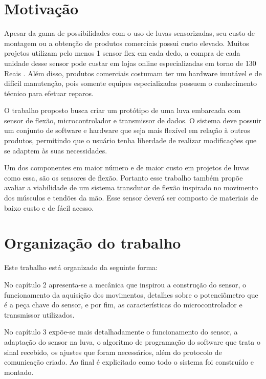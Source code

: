 \documentclass[
	12pt,				%
	openright,			%
	oneside,			%
	a4paper,			%
	english,			%
	brazil				%
	]{abntex2}
\begin{document}

		
		
		
		\section{Motivação}

		Apesar da gama de possibilidades com o uso de luvas sensorizadas, seu custo de montagem ou a obtenção de produtos comerciais possui custo elevado. Muitos projetos utilizam pelo menos 1 sensor flex em cada dedo, a compra de cada unidade desse sensor pode custar em lojas online especializadas em torno de 130 Reais \cite{multilogicaflexsensor}. Além disso, produtos comerciais costumam ter um hardware imutável e de difícil manutenção, pois somente equipes especializadas possuem o conhecimento técnico para efetuar reparos.

		O trabalho proposto busca criar um protótipo de uma luva embarcada com sensor de flexão, microcontrolador e transmissor de dados. O sistema deve possuir um conjunto de software e hardware que seja mais flexível em relação à outros produtos, permitindo que o usuário tenha liberdade de realizar modificações que se adaptem às suas necessidades. 

		Um dos componentes em maior número e de maior custo em projetos de luvas como essa, são os sensores de flexão. Portanto esse trabalho também propõe avaliar a viabilidade de um sistema transdutor de flexão inspirado no movimento dos músculos e tendões da mão. Esse sensor deverá ser composto de materiais de baixo custo e de fácil acesso.

		
		\section{Organização do trabalho}

		Este trabalho está organizado da seguinte forma:

		No capítulo 2 apresenta-se a mecânica que inspirou a construção do sensor, o funcionamento da aquisição dos movimentos, detalhes sobre o potenciômetro que é a peça chave do sensor, e por fim, as características do microcontrolador e transmissor utilizados.
		
		No capítulo 3 expõe-se mais detalhadamente o funcionamento do sensor, a adaptação do sensor na luva, o algoritmo de programação do software que trata o sinal recebido, os ajustes que foram necessários, além do protocolo de comunicação criado. Ao final é explicitado como todo o sistema foi construído e montado.
\end{document}
